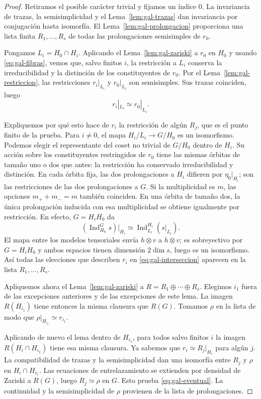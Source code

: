 \begin{proof}
Retiramos el posible carácter trivial y fijamos un índice $0$.
La invariancia de trazas, la semisimplicidad y el
Lema~\ref{lem:gal-trazas} dan invariancia por conjugación
hasta isomorfía.
El Lema~\ref{lem:gal-prolongacion} proporciona una lista finita
$R_1,\ldots,R_s$ de todas las prolongaciones semisimples de $r_0$.

Pongamos $L_i=H_0\cap H_i$.
Aplicando el Lema~\ref{lem:gal-zariski} a $r_0$ en $H_0$
y usando \eqref{eq:gal-fibras}, vemos que, salvo finitos $i$,
la restricción a $L_i$ conserva la irreducibilidad y la distinción
de los constituyentes de $r_0$.
Por el Lema~\ref{lem:gal-restriccion}, las restricciones
$r_i|_{L_i}$ y $r_0|_{L_i}$ son semisimples.
Sus trazas coinciden, luego
\begin{equation}
 r_i|_{L_i}\simeq r_0|_{L_i}.
 \label{eq:gal-interseccion}
\end{equation}

Expliquemos por qué esto hace de $r_i$ la restricción de algún
$R_j$, que es el punto finito de la prueba.
Para $i\ne0$, el mapa $H_i/L_i\to G/H_0$ es un isomorfismo.
Podemos elegir el representante del coset no trivial de $G/H_0$
dentro de $H_i$.
Su acción sobre los constituyentes restringidos de $r_0$
tiene las mismas órbitas de tamaño uno o dos que antes:
la restricción ha conservado irreducibilidad y distinción.
En cada órbita fija, las dos prolongaciones a $H_i$
difieren por $\eta_0|_{H_i}$; son las restricciones de las
dos prolongaciones a $G$.
Si la multiplicidad es $m$, las opciones
$m_++m_-=m$ también coinciden.
En una órbita de tamaño dos, la única prolongación inducida
con esa multiplicidad se obtiene igualmente por restricción.
En efecto, $G=H_iH_0$ da
\[
 (\operatorname{Ind}_{H_0}^G s)|_{H_i}
   \simeq\operatorname{Ind}_{L_i}^{H_i}(s|_{L_i}).
\]
El mapa entre los modelos tensoriales envía $h\otimes v$ a
$h\otimes v$; es sobreyectivo por $G=H_iH_0$ y ambos espacios
tienen dimensión $2\dim s$, luego es un isomorfismo.
Así todas las elecciones que describen $r_i$ en
\eqref{eq:gal-interseccion} aparecen en la lista $R_1,\ldots,R_s$.

Apliquemos ahora el Lema~\ref{lem:gal-zariski} a
$R=R_1\oplus\cdots\oplus R_s$.
Elegimos $i_1$ fuera de las excepciones anteriores y de las
excepciones de este lema. La imagen $R(H_{i_1})$ tiene entonces
la misma clausura que $R(G)$.
Tomamos $\rho$ en la lista de modo que
$\rho|_{H_{i_1}}\simeq r_{i_1}$.

Aplicando de nuevo el lema dentro de $H_{i_1}$,
para todos salvo finitos $i$ la imagen
$R(H_i\cap H_{i_1})$ tiene esa misma clausura.
Ya sabemos que $r_i\simeq R_j|_{H_i}$ para algún $j$.
La compatibilidad de trazas y la semisimplicidad dan una
isomorfía entre $R_j$ y $\rho$ en $H_i\cap H_{i_1}$.
Las ecuaciones de entrelazamiento se extienden por densidad
de Zariski a $R(G)$, luego $R_j\simeq\rho$ en $G$.
Esto prueba \eqref{eq:gal-eventual}.
La continuidad y la semisimplicidad de $\rho$ provienen
de la lista de prolongaciones.
\end{proof}

